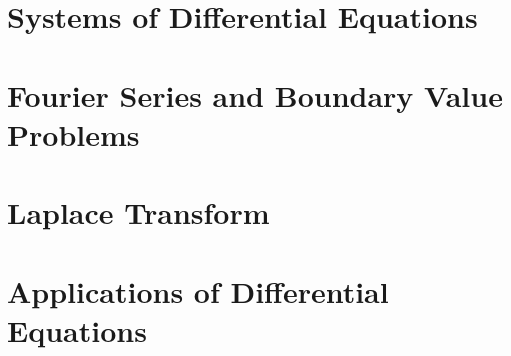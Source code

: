 \documentclass[14pt]{article}
\begin{document}
    \section{Systems of Differential Equations}
    \section{Fourier Series and Boundary Value Problems}
    \section{Laplace Transform}
    \section{Applications of Differential Equations}
\end{document}
